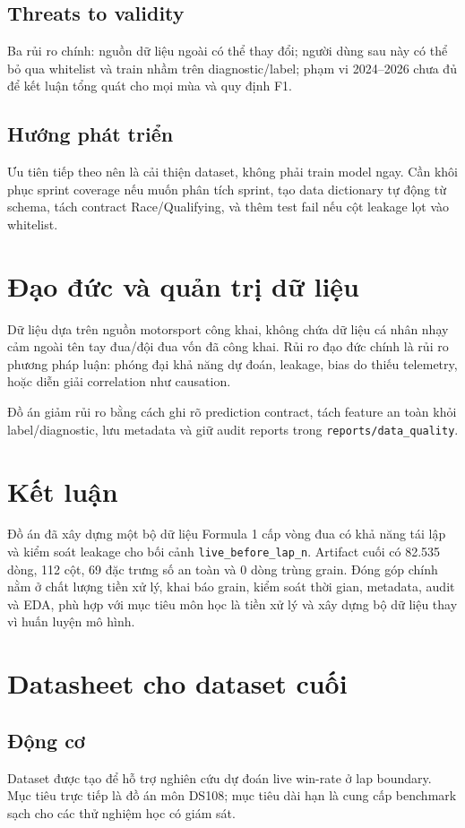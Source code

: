 \documentclass[conference]{IEEEtran}
\begin{document}
\subsection{Threats to validity}
Ba rủi ro chính: nguồn dữ liệu ngoài có thể thay đổi; người dùng sau này có thể bỏ qua whitelist và train nhầm trên diagnostic/label; phạm vi 2024--2026 chưa đủ để kết luận tổng quát cho mọi mùa và quy định F1.

\subsection{Hướng phát triển}
Ưu tiên tiếp theo nên là cải thiện dataset, không phải train model ngay. Cần khôi phục sprint coverage nếu muốn phân tích sprint, tạo data dictionary tự động từ schema, tách contract Race/Qualifying, và thêm test fail nếu cột leakage lọt vào whitelist.

\section{Đạo đức và quản trị dữ liệu}
Dữ liệu dựa trên nguồn motorsport công khai, không chứa dữ liệu cá nhân nhạy cảm ngoài tên tay đua/đội đua vốn đã công khai. Rủi ro đạo đức chính là rủi ro phương pháp luận: phóng đại khả năng dự đoán, leakage, bias do thiếu telemetry, hoặc diễn giải correlation như causation.

Đồ án giảm rủi ro bằng cách ghi rõ prediction contract, tách feature an toàn khỏi label/diagnostic, lưu metadata và giữ audit reports trong \texttt{reports/data\_quality}.

\section{Kết luận}
Đồ án đã xây dựng một bộ dữ liệu Formula 1 cấp vòng đua có khả năng tái lập và kiểm soát leakage cho bối cảnh \texttt{live\_before\_lap\_n}. Artifact cuối có 82.535 dòng, 112 cột, 69 đặc trưng số an toàn và 0 dòng trùng grain. Đóng góp chính nằm ở chất lượng tiền xử lý, khai báo grain, kiểm soát thời gian, metadata, audit và EDA, phù hợp với mục tiêu môn học là tiền xử lý và xây dựng bộ dữ liệu thay vì huấn luyện mô hình.

\appendices
\section{Datasheet cho dataset cuối}
\subsection{Động cơ}
Dataset được tạo để hỗ trợ nghiên cứu dự đoán live win-rate ở lap boundary. Mục tiêu trực tiếp là đồ án môn DS108; mục tiêu dài hạn là cung cấp benchmark sạch cho các thử nghiệm học có giám sát.
\end{document}
